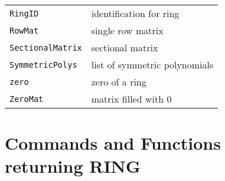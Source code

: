 \documentclass[a4paper]{mybook}
\begin{document}
\begin{center}
\begin{longtable}{ll}
{\verb~RingID~} &
      identification for ring\\
   
{\verb~RowMat~} &
      single row matrix\\
   
{\verb~SectionalMatrix~} &
      sectional matrix \\
   
{\verb~SymmetricPolys~} &
      list of symmetric polynomials\\
   
{\verb~zero~} &
      zero of a ring\\
   
{\verb~ZeroMat~} &
      matrix filled with 0\\
   
\end{longtable}
\end{center}

\noindent



\section{Commands and Functions returning RING}
\label{Commands and Functions returning RING}

        
\end{document}
